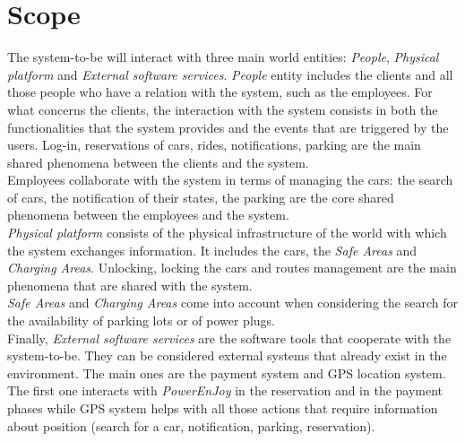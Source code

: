 \documentclass[11pt,a4paper]{report}
\begin{document}
\section{Scope}
The system-to-be will interact with three main world entities: \textit{People}, \textit{Physical platform} and \textit{External software services}.
\textit{People} entity includes the clients and all those people who have a relation with the system, such as the employees.
For what concerns the clients, the interaction with the system consists in both the functionalities that the system provides and the events that are triggered by the users. Log-in, reservations of cars, rides, notifications, parking are the main shared phenomena between the clients and the system.\\Employees collaborate with the system in terms of managing the cars: the search of cars, the notification of their states, the parking are the core shared phenomena between the employees and the system.\\
\textit{Physical platform} consists of the physical infrastructure of the world with which the system exchanges information. It includes the cars, the \textit{Safe Areas} and \textit{Charging Areas}.
Unlocking, locking the cars and routes management are the main phenomena that are shared with the system.\\\textit{Safe Areas} and \textit{Charging Areas} come into account when considering the search for the availability of parking lots or of power plugs.\\Finally, \textit{External software services} are the software tools that cooperate with the system-to-be. They can be considered external systems that already exist in the environment. The main ones are the payment system and GPS location system. The first one interacts with \textit{PowerEnJoy} in the reservation and in the payment phases while GPS system helps with all those actions that require information about position (search for a car, notification, parking, reservation).
\end{document}
